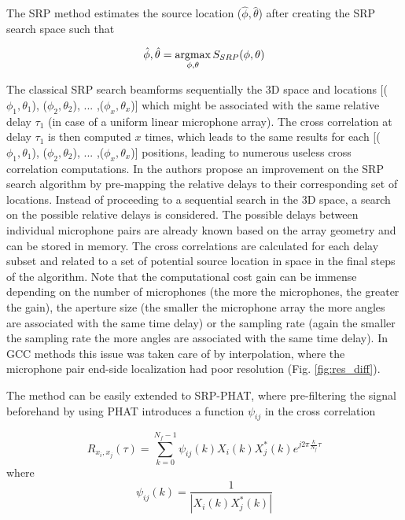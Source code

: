 The SRP method estimates the source location ($\hat{\phi},\hat{\theta}$) after creating the SRP search space such that

\begin{equation}
    \hat{\phi},\hat{\theta}=\argmax_{\phi,\theta}S_{SRP}(\phi,\theta)
\end{equation}


The classical SRP search beamforms sequentially the 3D space and locations [($\phi_{1},\theta_{1}$), ($\phi_{2},\theta_{2}$), ... ,($\phi_{x},\theta_{x}$)] which might be associated with the same relative delay $\tau_{1}$ (in case of a uniform linear microphone array). The cross correlation at delay $\tau_{1}$ is then computed $x$ times, which leads to the same results for each [($\phi_{1},\theta_{1}$), ($\phi_{2},\theta_{2}$), ... ,($\phi_{x},\theta_{x}$)] positions, leading to numerous useless cross correlation computations. In \cite{dmochowski2007generalized} the authors propose an improvement on the SRP search algorithm by pre-mapping the relative delays to their corresponding set of locations. Instead of proceeding to a sequential search in the 3D space, a search on the possible relative delays is considered. The possible delays between individual microphone pairs are already known based on the array geometry and can be stored in memory. The cross correlations are calculated for each delay subset and related to a set of potential source location in space in the final steps of the algorithm. Note that the computational cost gain can be immense depending on the number of microphones (the more the microphones, the greater the gain), the aperture size (the smaller the microphone array the more angles are associated with the same time delay) or the sampling rate (again the smaller the sampling rate the more angles are associated with the same time delay). In GCC methods this issue was taken care of by interpolation, where the microphone pair end-side localization had poor resolution (Fig. \ref{fig:res_diff}). 

The method can be easily extended to SRP-PHAT, where pre-filtering the signal beforehand by using PHAT introduces a function $\psi_{ij}$ in the cross correlation

\begin{equation}
    R_{x_i,x_j}(\tau)= \sum\limits_{k=0}^{N_{f}-1}{\psi_{ij}(k) X_{i}(k)X_{j}^*(k)e^{j2\pi\frac{k}{N_{f}}\tau}}
\end{equation}
where
\begin{equation}
    \psi_{ij}(k) = \frac{1}{|{X_{i}(k)X_{j}^*(k)}|}
\end{equation}

